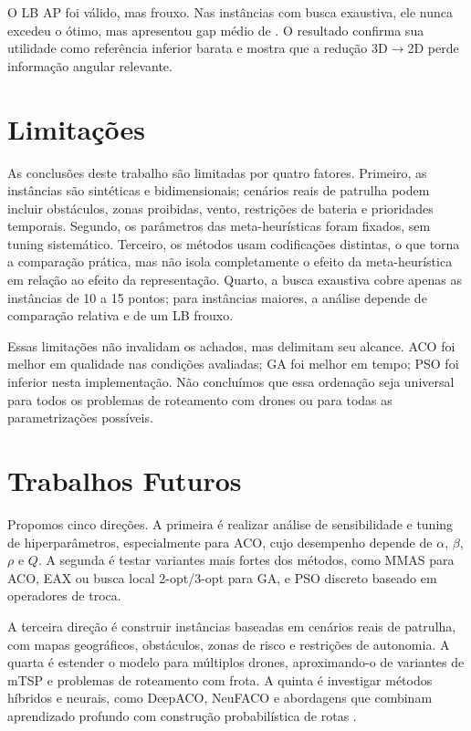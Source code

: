 O \ac{LB} \ac{AP} foi válido, mas frouxo. Nas \TotalInstanciasComOtimo{} instâncias com busca exaustiva, ele nunca excedeu o ótimo, mas apresentou gap médio de \GapLBMedio{}. O resultado confirma sua utilidade como referência inferior barata e mostra que a redução 3D$\to$2D perde informação angular relevante.

\section{Limitações}

As conclusões deste trabalho são limitadas por quatro fatores. Primeiro, as instâncias são sintéticas e bidimensionais; cenários reais de patrulha podem incluir obstáculos, zonas proibidas, vento, restrições de bateria e prioridades temporais. Segundo, os parâmetros das meta-heurísticas foram fixados, sem tuning sistemático. Terceiro, os métodos usam codificações distintas, o que torna a comparação prática, mas não isola completamente o efeito da meta-heurística em relação ao efeito da representação. Quarto, a busca exaustiva cobre apenas as instâncias de 10 a 15 pontos; para instâncias maiores, a análise depende de comparação relativa e de um \ac{LB} frouxo.

Essas limitações não invalidam os achados, mas delimitam seu alcance. \ac{ACO} foi melhor em qualidade nas condições avaliadas; \ac{GA} foi melhor em tempo; \ac{PSO} foi inferior nesta implementação. Não concluímos que essa ordenação seja universal para todos os problemas de roteamento com drones ou para todas as parametrizações possíveis.

\section{Trabalhos Futuros}

Propomos cinco direções. A primeira é realizar análise de sensibilidade e tuning de hiperparâmetros, especialmente para \ac{ACO}, cujo desempenho depende de $\alpha$, $\beta$, $\rho$ e $Q$. A segunda é testar variantes mais fortes dos métodos, como MMAS para \ac{ACO}, EAX ou busca local 2-opt/3-opt para \ac{GA}, e \ac{PSO} discreto baseado em operadores de troca.

A terceira direção é construir instâncias baseadas em cenários reais de patrulha, com mapas geográficos, obstáculos, zonas de risco e restrições de autonomia. A quarta é estender o modelo para múltiplos drones, aproximando-o de variantes de mTSP e problemas de roteamento com frota. A quinta é investigar métodos híbridos e neurais, como DeepACO, NeuFACO e abordagens que combinam aprendizado profundo com construção probabilística de rotas \cite{deepaco2023,neufaco2025,gpaco2025}.

